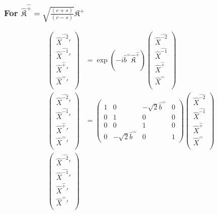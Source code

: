 \documentclass[]{article}
\numberwithin{equation}{section}
\begin{document}
{{\subsubsection{For $\hat{\mathfrak{K}}^{\hat{+}}=\sqrt{\frac{(c+s)}{(c-s)}}\mathfrak{K}^{{+}}$}
\begin{align}
\begin{pmatrix}
    \hat{X}^{\hat{-2}}'\\
    \hat{X}^{\hat{-1}}'\\
    \hat{X}^{\hat{+}}'\\
    \hat{X}^{\hat{-}}'\\
    \end{pmatrix}&= \exp{(-i\hat{b}^{\hat{-}}\hat{\mathfrak{K}}^{\hat{+}})}\begin{pmatrix}
    \hat{X}^{\hat{-2}}\\
    \hat{X}^{\hat{-1}}\\
    \hat{X}^{\hat{+}}\\
    \hat{X}^{\hat{-}}\\
    \end{pmatrix}\\
    \begin{pmatrix}
    \hat{X}^{\hat{-2}}'\\
    \hat{X}^{\hat{-1}}'\\
    \hat{X}^{\hat{+}}'\\
    \hat{X}^{\hat{-}}'\\
    \end{pmatrix}&= \begin{pmatrix}
        1&0&-\sqrt{2}\hat{b}^{\hat{-}}&0\\
        0&1&0&0\\
        0&0&1&0\\
        0&-\sqrt{2}\hat{b}^{\hat{-}}&0&1
    \end{pmatrix}\begin{pmatrix}
    \hat{X}^{\hat{-2}}\\
    \hat{X}^{\hat{-1}}\\
    \hat{X}^{\hat{+}}\\
    \hat{X}^{\hat{-}}\\
    \end{pmatrix}\\
    \begin{pmatrix}
    \hat{X}^{\hat{-2}}'\\
    \hat{X}^{\hat{-1}}'\\
    \hat{X}^{\hat{+}}'\\
    \hat{X}^{\hat{-}}'\\

\end{pmatrix}
\end{align}}}
\end{document}
